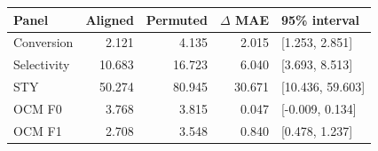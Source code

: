 \begin{tabular}{lrrrl}\toprule
Panel & Aligned & Permuted & $\Delta$ MAE & 95\% interval \\ \midrule
Conversion & 2.121 & 4.135 & 2.015 & [1.253, 2.851] \\
Selectivity & 10.683 & 16.723 & 6.040 & [3.693, 8.513] \\
STY & 50.274 & 80.945 & 30.671 & [10.436, 59.603] \\
OCM F0 & 3.768 & 3.815 & 0.047 & [-0.009, 0.134] \\
OCM F1 & 2.708 & 3.548 & 0.840 & [0.478, 1.237] \\
\bottomrule\end{tabular}

